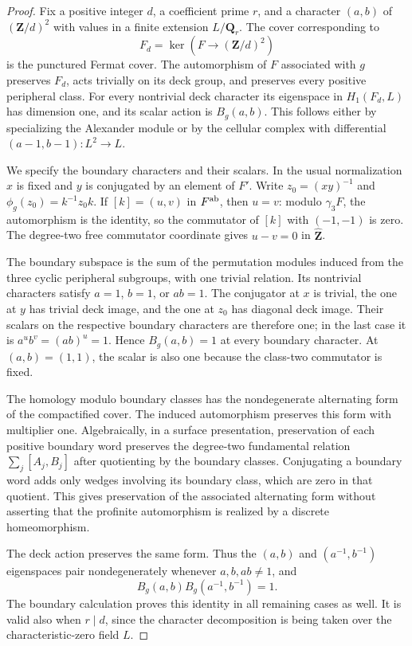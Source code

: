 \begin{proof}
Fix a positive integer \(d\), a coefficient prime \(r\), and a
character \((a,b)\) of \((\mathbf Z/d)^2\) with values in a
finite extension \(L/\mathbf Q_r\).  The cover corresponding to
\[
                         F_d=\ker(F\to(\mathbf Z/d)^2)
\]
is the punctured Fermat cover.  The automorphism of \(F\)
associated with \(g\) preserves \(F_d\), acts trivially on its
deck group, and preserves every positive peripheral class.
For every nontrivial deck character its eigenspace in
\(H_1(F_d,L)\) has dimension one, and its scalar action is
\(B_g(a,b)\).  This follows either by specializing the
Alexander module or by the cellular complex with differential
\((a-1,b-1):L^2\to L\).

We specify the boundary characters and their scalars.  In
the usual normalization \(x\) is fixed and \(y\) is conjugated
by an element of \(F'\).  Write \(z_0=(xy)^{-1}\) and
\(\phi_g(z_0)=k^{-1}z_0k\).  If \([k]=(u,v)\) in
\(F^{\rm ab}\), then \(u=v\): modulo \(\gamma_3F\),
the automorphism is the identity, so the commutator of
\([k]\) with \((-1,-1)\) is zero.  The degree-two free
commutator coordinate gives \(u-v=0\) in
\(\widehat{\mathbf Z}\).

The boundary subspace is the sum of the permutation modules
induced from the three cyclic peripheral subgroups, with one
trivial relation.  Its nontrivial characters satisfy
\(a=1\), \(b=1\), or \(ab=1\).
The conjugator at \(x\) is trivial, the one at \(y\) has
trivial deck image, and the one at \(z_0\) has diagonal deck
image.  Their scalars on the respective boundary characters
are therefore one; in the last case it is
\(a^u b^v=(ab)^u=1\).
Hence \(B_g(a,b)=1\) at every boundary character.
At \((a,b)=(1,1)\), the scalar is also one because the
class-two commutator is fixed.

The homology modulo boundary classes has the nondegenerate
alternating form of the compactified cover.  The induced
automorphism preserves this form with multiplier one.
Algebraically, in a surface presentation, preservation of
each positive boundary word preserves the degree-two
fundamental relation \(\sum_j[A_j,B_j]\) after quotienting
by the boundary classes.  Conjugating a boundary word adds
only wedges involving its boundary class, which are zero in
that quotient.  This gives preservation of the associated
alternating form without asserting that the profinite
automorphism is realized by a discrete homeomorphism.

The deck action preserves the same form.  Thus the
\((a,b)\) and \((a^{-1},b^{-1})\) eigenspaces pair
nondegenerately whenever \(a,b,ab\ne1\), and
\[
                         B_g(a,b)B_g(a^{-1},b^{-1})=1.
\]
The boundary calculation proves this identity in all
remaining cases as well.  It is valid also when \(r\mid d\),
since the character decomposition is being taken over the
characteristic-zero field \(L\).


\end{proof}
